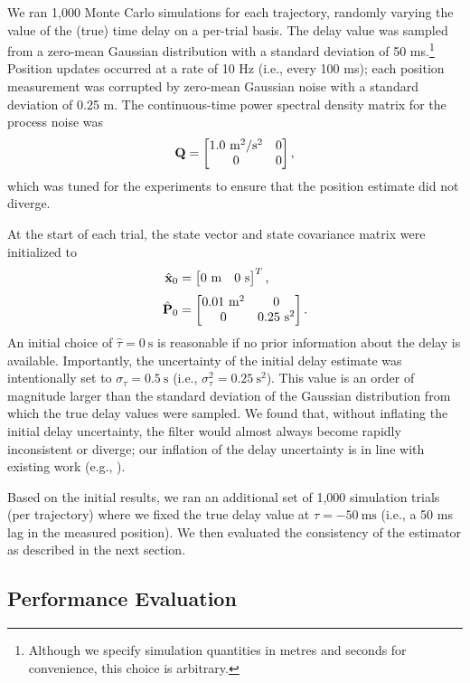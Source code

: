 \documentclass[letterpaper,10pt,conference]{ieeeconf}
\theoremstyle{definition}
\begin{document}
We ran 1,000 Monte Carlo simulations for each trajectory, randomly varying the value of the (true) time delay on a per-trial basis.
%
The delay value was sampled from a zero-mean Gaussian distribution with a standard deviation of 50 ms.\footnote{Although we specify simulation quantities in metres and seconds for convenience, this choice is arbitrary.}
%
Position updates occurred at a rate of 10 Hz (i.e., every 100 ms); each position measurement was corrupted by zero-mean Gaussian noise with a standard deviation of 0.25 m.
%
The continuous-time power spectral density matrix \cite{2008_Farrell_Aided} for the process noise was
%
\begin{equation}
\boldsymbol{\mathbf{Q}} = \begin{bmatrix} 1.0~\text{m$^{2}$/s$^{2}$} & 0 \\ 0 & 0 \end{bmatrix},
\end{equation}
%
which was tuned for the experiments to ensure that the position estimate did not diverge.

At the start of each trial, the state vector and state covariance matrix were initialized to
%
\begin{align}
\hat{\boldsymbol{\mathbf{x}}}_{0} & = \begin{bmatrix} 0~\text{m} & 0~\text{s} \end{bmatrix}^{T}, \\[1mm]
\hat{\boldsymbol{\mathbf{P}}}_{0} & = \begin{bmatrix} 0.01~\text{m$^{2}$} & 0 \\ 0 & 0.25~\text{s$^{2}$} \end{bmatrix}.
\end{align}
%
An initial choice of $\hat{\tau} = 0~\text{s}$ is reasonable if no prior information about the delay is available.
%
Importantly, the uncertainty of the initial delay estimate was intentionally set to $\sigma_{\tau} = 0.5~\text{s}$ (i.e., $\sigma^{2}_{\tau} = 0.25~\text{s}^2$).
%
This value is an order of magnitude larger than the standard deviation of the Gaussian distribution from which the true delay values were sampled.
%
We found that, without inflating the initial delay uncertainty, the filter would almost always become rapidly inconsistent or diverge;
%
our inflation of the delay uncertainty is in line with existing work (e.g., \cite{2020_Geneva_OpenVINS}).

Based on the initial results, we ran an additional set of 1,000 simulation trials (per trajectory) where we fixed the true delay value at $\tau = -50~\text{ms}$ (i.e., a 50 ms lag in the measured position).
%
We then evaluated the consistency of the estimator as described in the next section.

\subsection{Performance Evaluation}
\label{subsec:performance}
\end{document}
